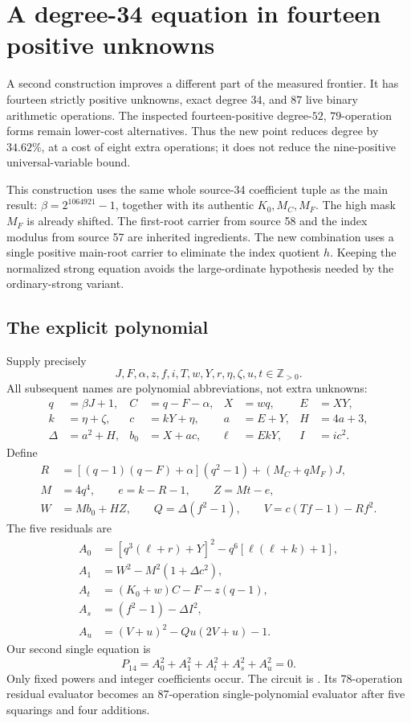 \section{A degree-34 equation in fourteen positive unknowns}
\label{sec:positive14}

A second construction improves a different part of the measured frontier.
It has fourteen strictly positive unknowns, exact degree $34$, and $87$
live binary arithmetic operations. The inspected fourteen-positive
degree-$52$, $79$-operation forms remain lower-cost alternatives. Thus the
new point reduces degree by $34.62\%$, at a cost of eight extra operations;
it does not reduce the nine-positive universal-variable bound.

This construction uses the same whole source-34 coefficient tuple as the
main result: $\beta=2^{1064921}-1$, together with its authentic $K_0,M_C,M_F$.
The high mask $M_F$ is already shifted. The first-root carrier from source
58 and the index modulus from source 57 are inherited ingredients. The new
combination uses a single positive main-root carrier to eliminate the index
quotient $h$. Keeping the normalized strong equation avoids the
large-ordinate hypothesis needed by the ordinary-strong variant.

\subsection{The explicit polynomial}

Supply precisely
\[
 J,F,\alpha,z,f,i,T,w,Y,r,\eta,\zeta,u,t\in\mathbb Z_{>0}.
\]
All subsequent names are polynomial abbreviations, not extra unknowns:
\begin{align*}
 q&=\beta J+1,& C&=q-F-\alpha,&X&=wq,&E&=XY,\\
 k&=\eta+\zeta,&c&=kY+\eta,&a&=E+Y,&H&=4a+3,\\
 \Delta&=a^2+H,&b_0&=X+ac,&\ell&=EkY,&I&=ic^2.
\end{align*}
Define
\begin{align*}
 R&=[(q-1)(q-F)+\alpha](q^2-1)+(M_C+qM_F)J,\\
 M&=4q^4,\qquad e=k-R-1,\qquad Z=Mt-e,\\
 W&=Mb_0+HZ,\qquad Q=\Delta(f^2-1),\qquad
 V=c(Tf-1)-Rf^2.
\end{align*}
The five residuals are
\begin{align}
 A_0&=[q^3(\ell+r)+Y]^2-q^6[\ell(\ell+k)+1],\label{eq:p14-first}\\
 A_1&=W^2-M^2(1+\Delta c^2),\label{eq:p14-main}\\
 A_t&=(K_0+w)C-F-z(q-1),\label{eq:p14-transport}\\
 A_s&=(f^2-1)-\Delta I^2,\label{eq:p14-strong}\\
 A_u&=(V+u)^2-Qu(2V+u)-1.\label{eq:p14-aux}
\end{align}
Our second single equation is
\begin{equation}
 \boxed{P_{14}=A_0^2+A_1^2+A_t^2+A_s^2+A_u^2=0.}
 \label{eq:p14}
\end{equation}
Only fixed powers and integer coefficients occur. The circuit is
. Its 78-operation residual evaluator
becomes an 87-operation single-polynomial evaluator after five squarings
and four additions.

